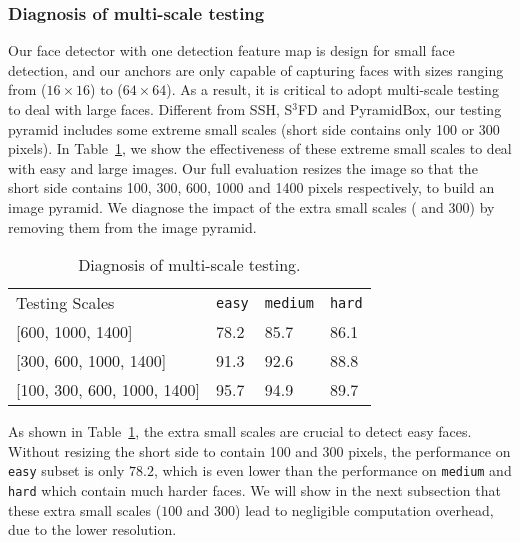 \documentclass[10pt,twocolumn,letterpaper]{article}
\begin{document}
\subsubsection*{Diagnosis of multi-scale testing}
Our face detector with one detection feature map is design for small face detection, and our anchors
are only capable of capturing faces with sizes ranging from ($16\times 16$) to
($64\times 64$). As a result, it is critical to adopt multi-scale testing to deal with large faces.
Different from SSH, S$^3$FD and PyramidBox, our testing pyramid includes some extreme
small scales (\ie short side contains only 100 or 300 pixels). In Table~\ref{tbl:scale},
we show the effectiveness of these extreme small scales to deal with easy and large images.
Our full evaluation resizes the image so that the short side contains 100, 300, 600, 1000
and 1400 pixels respectively, to build an image pyramid. We diagnose the impact of the
extra small scales ( and 300) by removing them from the image pyramid.

\begin{table}[ht]
\centering
\begin{tabular}{|l|l|l|l|}
\hline
Testing Scales                  & \texttt{easy}& \texttt{medium} & \texttt{hard} \\ \hhline{|=|=|=|=|}
{[}600, 1000, 1400{]}           & 78.2     & 85.7      & 86.1     \\ \hline
{[}300, 600, 1000, 1400{]}      & 91.3     & 92.6      & 88.8     \\ \hline
{[}100, 300, 600, 1000, 1400{]} & 95.7 & 94.9  & 89.7 \\ \hline
\end{tabular}
\caption{Diagnosis of multi-scale testing.\label{tbl:scale}}
\end{table}

As shown in Table~\ref{tbl:scale}, the extra small scales are crucial to detect
easy faces. Without resizing the short side to contain 100 and 300 pixels, the performance
on \texttt{easy} subset is only $78.2$, which is even lower than the performance on \texttt{medium}
and \texttt{hard} which contain much harder faces. We will show in the next subsection that
these extra small scales ($100$ and $300$) lead to negligible computation overhead, due to the
lower resolution.
\end{document}
